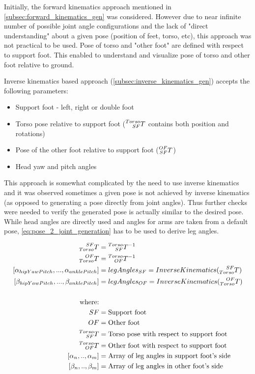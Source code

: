 \documentclass[english, printversion, nomenclature, notitle]{tuvisionthesis} %
\begin{document}
Initially, the forward kinematics approach mentioned in \cref{subsec:forward_kinematics_gen} was considered. However due to near infinite number of possible joint angle configurations and the lack of "direct understanding" about a given pose (position of feet, torso, etc), this approach was not practical to be used. Pose of torso and "other foot" are defined with respect to support foot. This enabled to understand and visualize pose of torso and other foot relative to ground.

Inverse kinematics based approach (\cref{subsec:inverse_kinematics_gen}) accepts the following parameters:
\begin{itemize}
	\item Support foot - left, right or double foot
	\item Torso pose relative to support foot ($\prescript{Torso}{SF}{T}$ contains both position and rotations)
	\item Pose of the other foot relative to support foot ($\prescript{OF}{SF}{T}$)
	\item Head yaw and pitch angles
\end{itemize}

This approach is somewhat complicated by the need to use inverse kinematics and it was observed sometimes a given pose is not achieved by inverse kinematics (as opposed to generating a pose directly from joint angles). Thus further checks were needed to verify the generated pose is actually similar to the desired pose. While head angles are directly used and angles for arms are taken from a default pose, \cref{eq:pose_2_joint_generation} has to be used to derive leg angles.

\begin{equation}
\label{eq:pose_2_joint_generation}
\begin{aligned}
\prescript{SF}{Torso}{T} &= \prescript{Torso}{SF}{T}^{-1} \\
\prescript{OF}{Torso}{T} &= \prescript{Torso}{OF}{T}^{-1} \\
[\alpha_{hipYawPitch}, ... , \alpha_{anklePitch}] &= legAngles_{SF} = InverseKinematics(\prescript{SF}{Torso}{T}) \\
[\beta_{hipYawPitch}, ... , \beta_{anklePitch}] &= legAngles_{OF} = InverseKinematics(\prescript{OF}{Torso}{T}) \\ \\
\text{where:} \\
SF &= \text{Support foot} \\
OF &= \text{Other foot} \\
\prescript{Torso}{SF}{T} &= \text{Torso pose with respect to support foot} \\
\prescript{Torso}{OF}{T} &= \text{Other foot with respect to support foot} \\
[\alpha_n, .., \alpha_m] &= \text{Array of leg angles in support foot's side} \\
[\beta_n, .., \beta_m] &= \text{Array of leg angles in other foot's side}
\end{aligned}
\end{equation}
\end{document}
